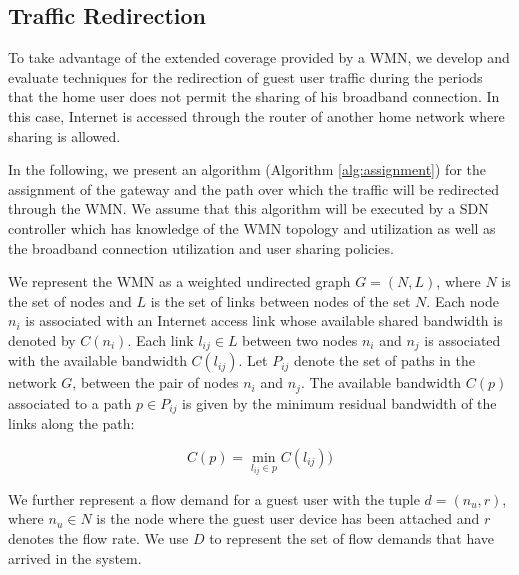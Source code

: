 \subsection{Traffic Redirection}
\label{architecture:redirection}

To take advantage of the extended coverage provided by a WMN, we develop and evaluate techniques for the redirection of guest user traffic during the periods that the home user does not permit the sharing of his broadband connection. In this case, Internet is accessed through the router of another home network where sharing is allowed. 

In the following, we present an algorithm (Algorithm \ref{alg:assignment}) for the assignment of the gateway and the path over which the traffic will be redirected through the WMN. We assume that this algorithm will be executed by a SDN controller which has knowledge of the WMN topology and utilization as well as the broadband connection utilization and user sharing policies. 

We represent the WMN as a weighted undirected graph $G = (N, L)$, where $N$ is the set of nodes and $L$ is the set of links between nodes of the set $N$. Each node $n_i$ is associated with an Internet access link whose available shared bandwidth is denoted by $C(n_i)$. Each link $l_{ij} \in L$ between two nodes $n_i$ and $n_j$ is associated with the available bandwidth $C(l_{ij})$. Let $P_{ij}$ denote the set of paths in the network $G$, between the pair of nodes $n_i$ and $n_j$. The available bandwidth $C(p)$ associated to a path $p \in P_{ij}$ is given by the minimum residual bandwidth of the links along the path:

\begin{equation}
C(p) = \min_{l_{ij} \in p} C(l_{ij}))
\end{equation}

We further represent a flow demand for a guest user with the tuple $d = (n_u, r)$, where $n_u \in N$ is the node where the guest user device has been attached and $r$ denotes the flow rate. We use $D$ to represent the set of flow demands that have arrived in the system.

